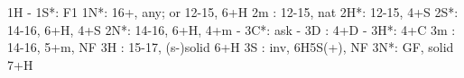 1H - 1S*: F1
1N*: 16+, any; or 12-15, 6+H
2m : 12-15, nat
2H*: 12-15, 4+S
2S*: 14-16, 6+H, 4+S
2N*: 14-16, 6+H, 4+m
   - 3C*: ask
        - 3D : 4+D
        - 3H*: 4+C
3m : 14-16, 5+m, NF
3H : 15-17, (s-)solid 6+H
3S : inv, 6H5S(+), NF
3N*: GF, solid 7+H